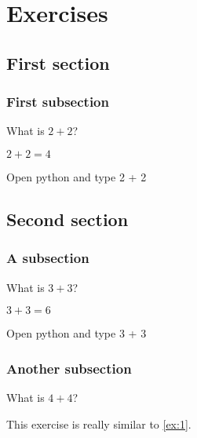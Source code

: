 \documentclass{book}
\begin{document}
\chapter{Exercises}

\section{First section}

\subsection{First subsection}

\begin{exercise}[subtitle={Simple Addition}]
  What is \(2 + 2\)?
\end{exercise}

\begin{solution}
  \(2 + 2 = 4\)
\end{solution}

\begin{additionalinformation}
Open python and type 2 + 2
\end{additionalinformation}

\section{Second section}

\subsection{A subsection}

\begin{exercise}[examdate={January 14, 2020}, examproblemnumber={1}, examproblemid={2020-01-14-01}]
  What is \(3 + 3\)?
\end{exercise}

\begin{solution}
  \(3 + 3 = 6\)
\end{solution}

\begin{additionalinformation}
Open python and type 3 + 3
\end{additionalinformation}

\subsection{Another subsection}

\begin{exercise}
  What is \(4 + 4\)?

  This exercise is really similar to \cref{ex:1}.
\end{exercise}
\end{document}
